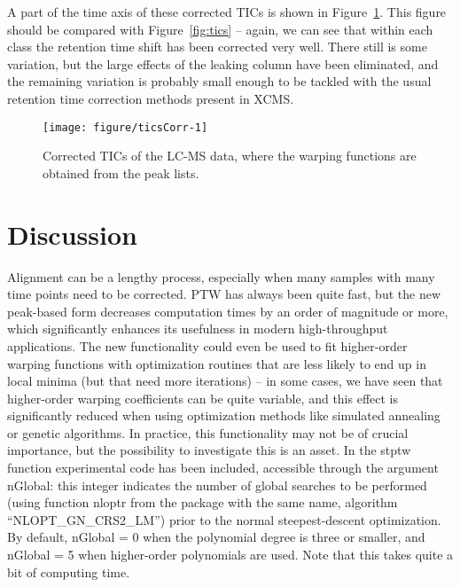 \documentclass[a4paper,11pt]{article}\usepackage[]{graphicx}\usepackage[]{color}
\newenvironment{knitrout}{}{} %
\newcommand{\code}[1]{{\ttfamily #1}}
\begin{document}
\noindent
A part of the time axis of these corrected TICs is
shown in Figure~\ref{fig:ticsCorr}. This figure should be compared
with Figure~\ref{fig:tics} -- again, we can see that within each class
the retention time shift has been corrected very well. There still is
some variation, but the large effects of the leaking column have been
eliminated, and the remaining variation is probably small enough to be
tackled with the usual retention time correction methods present in
\code{XCMS}.

\begin{figure}[tb]
\centering
\begin{knitrout}\small
{}\color{fgcolor}
\texttt{[image: figure/ticsCorr-1]} 
\end{knitrout}
\caption{Corrected TICs of the LC-MS data, where the warping functions
  are obtained from the peak lists.}
\label{fig:ticsCorr}
\end{figure}

\section{Discussion}
Alignment can be a lengthy process, especially when many samples with
many time points need to be corrected. PTW has always been quite fast,
but the new peak-based form decreases computation times by an order of
magnitude or more, which significantly enhances its usefulness in
modern high-throughput applications. The new functionality could even
be used to fit higher-order warping functions with optimization
routines that are less likely to end up in local minima (but that need
more iterations) -- in some cases, we have seen that higher-order
warping coefficients can be quite variable, and this effect is
significantly reduced when using optimization methods like simulated
annealing or genetic algorithms. In practice, this functionality may
not be of crucial importance, but the possibility to investigate this
is an asset. In the \code{stptw} function experimental code has been
included, accessible through the argument \code{nGlobal}: this integer
indicates the number of global searches to be performed (using
function \code{nloptr} from the package with the same name, algorithm
``\code{NLOPT\_GN\_CRS2\_LM}'') prior to the normal steepest-descent
optimization. By default, \code{nGlobal = 0} when the polynomial
degree is three or smaller, and \code{nGlobal = 5} when higher-order
polynomials are used. Note that this takes quite a bit of computing time.
\end{document}
